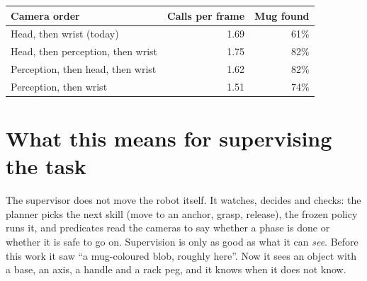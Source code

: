 \documentclass[11pt,a4paper]{article}
\begin{document}
\begin{center}
\small
\begin{tabularx}{\textwidth}{@{}Xrr@{}}
\toprule
Camera order & Calls per frame & Mug found \\
\midrule
Head, then wrist (today) & 1.69 & 61\% \\
Head, then perception, then wrist & 1.75 & 82\% \\
Perception, then head, then wrist & 1.62 & 82\% \\
Perception, then wrist & 1.51 & 74\% \\
\bottomrule
\end{tabularx}
\end{center}

\section{What this means for supervising the task}\label{sec:supervision}

The supervisor does not move the robot itself. It watches, decides and checks: the planner
picks the next skill (move to an anchor, grasp, release), the frozen policy runs it, and
predicates read the cameras to say whether a phase is done or whether it is safe to go on.
Supervision is only as good as what it can \emph{see}. Before this work it saw ``a mug-coloured
blob, roughly here''. Now it sees an object with a base, an axis, a handle and a rack peg,
and it knows when it does not know.
\end{document}
